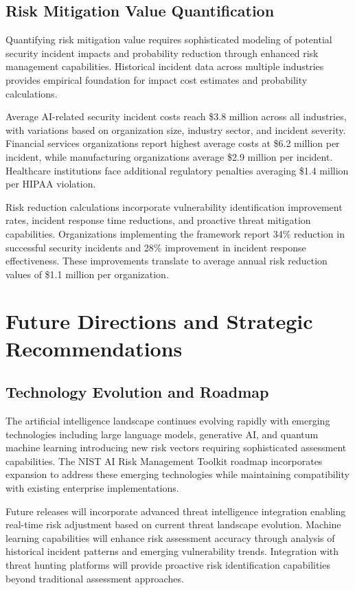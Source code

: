 \documentclass[11pt,letterpaper]{article}
\begin{document}
\subsection{Risk Mitigation Value Quantification}

Quantifying risk mitigation value requires sophisticated modeling of potential security incident impacts and probability reduction through enhanced risk management capabilities. Historical incident data across multiple industries provides empirical foundation for impact cost estimates and probability calculations.

Average AI-related security incident costs reach \$3.8 million across all industries, with variations based on organization size, industry sector, and incident severity. Financial services organizations report highest average costs at \$6.2 million per incident, while manufacturing organizations average \$2.9 million per incident. Healthcare institutions face additional regulatory penalties averaging \$1.4 million per HIPAA violation.

Risk reduction calculations incorporate vulnerability identification improvement rates, incident response time reductions, and proactive threat mitigation capabilities. Organizations implementing the framework report 34\% reduction in successful security incidents and 28\% improvement in incident response effectiveness. These improvements translate to average annual risk reduction values of \$1.1 million per organization.

\section{Future Directions and Strategic Recommendations}

\subsection{Technology Evolution and Roadmap}

The artificial intelligence landscape continues evolving rapidly with emerging technologies including large language models, generative AI, and quantum machine learning introducing new risk vectors requiring sophisticated assessment capabilities. The NIST AI Risk Management Toolkit roadmap incorporates expansion to address these emerging technologies while maintaining compatibility with existing enterprise implementations.

Future releases will incorporate advanced threat intelligence integration enabling real-time risk adjustment based on current threat landscape evolution. Machine learning capabilities will enhance risk assessment accuracy through analysis of historical incident patterns and emerging vulnerability trends. Integration with threat hunting platforms will provide proactive risk identification capabilities beyond traditional assessment approaches.
\end{document}

